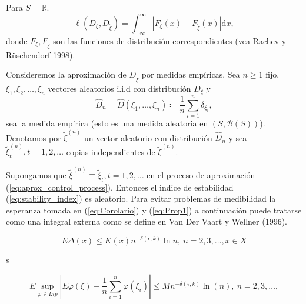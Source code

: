 \documentclass[11pt, spanish]{amsart}
\begin{document}
\begin{rem}
Para $S=\mathbb{R}$. 
\[
\ell\left(D_{\xi},D_{\widetilde{\xi}}\right)=\int_{-\infty}^{\infty}\left|F_{\xi}\left(x\right)-F_{\widetilde{\xi}}\left(x\right)\right|\mathrm{d}x,
\]
donde $F_{\xi},F_{\widetilde{\xi}}$ son las funciones de distribución
correspondientes (vea Rachev y Rüschendorf 1998). 

Consideremos la aproximación de $D_{\widetilde{\xi}}$ por medidas
empíricas. Sea $n\geq1$ fijo, $\xi_{1},\xi_{2},\ldots,\xi_{n}$ vectores
aleatorios i.i.d con distribución $D_{\xi}$ y 
\[
\widehat{D}_{n}=\widehat{D}\left(\xi_{1},\ldots,\xi_{n}\right)\coloneqq\dfrac{1}{n}\sum_{i=1}^{n}\delta_{\xi_{i}},
\]
sea la medida empírica (esto es una medida aleatoria en $\left(S,\mathcal{B}\left(S\right)\right)$).
Denotamos por $\widetilde{\xi}^{\left(n\right)}$ un vector aleatorio
con distribución $\widehat{D}_{n}$ y sea $\widetilde{\xi}_{t}^{\left(n\right)},t=1,2,\ldots$
copias independientes de $\widetilde{\xi}^{\left(n\right)}$.

Supongamos que $\widetilde{\xi}^{\left(n\right)}\equiv\widetilde{\xi}_{t},t=1,2,\ldots$
en el proceso de aproximación (\ref{eq:aprox_control_process}). Entonces
el indice de estabilidad (\ref{eq:stability_index}) es aleatorio.
Para evitar problemas de medibilidad la esperanza tomada en (\ref{eq:Corolario})
y (\ref{eq:Prop1}) a continuación puede tratarse como una integral
externa como se define en Van Der Vaart y Wellner (1996).
\end{rem}
%
\begin{cor}
\label{cor:Corolario1}

\begin{equation}
E\Delta\left(x\right)\leq K\left(x\right)n^{-\delta\left(\epsilon,k\right)}\ln n,\ n=2,3,\ldots,x\in X\label{eq:Corolario}
\end{equation}
\end{cor}
%
\begin{prop}
s

\begin{equation}
E\sup_{\varphi\in Lip}\left|E\varphi\left(\xi\right)-\dfrac{1}{n}\sum_{i=1}^{n}\varphi\left(\xi_{i}\right)\right|\leq Mn^{-\delta\left(\epsilon,k\right)}\ln\left(n\right),\ n=2,3,\ldots,\label{eq:Prop1}
\end{equation}
\end{prop}
\end{document}
